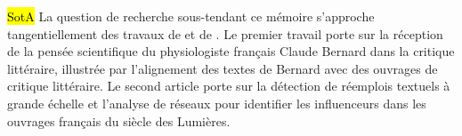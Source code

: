 \hl{SotA} La question de recherche sous-tendant ce mémoire s'approche tangentiellement des travaux de \citet{riguet2018impact} et de \citet{roe2023enlightenment}. Le premier travail porte sur la réception de la pensée scientifique du physiologiste français Claude Bernard dans la critique littéraire, illustrée par l'alignement des textes de Bernard avec des ouvrages de critique littéraire. Le second article porte sur la détection de réemplois textuels à grande échelle et l'analyse de réseaux pour identifier les \og{}influenceurs\fg{} dans les ouvrages français du siècle des Lumières.


%
